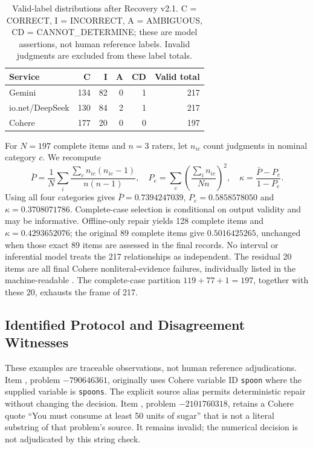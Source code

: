 \begin{table}[htbp]\centering\small
\caption{Valid-label distributions after Recovery v2.1. C = CORRECT, I = INCORRECT, A = AMBIGUOUS, CD = CANNOT\_DETERMINE; these are model assertions, not human reference labels. Invalid judgments are excluded from these label totals.}\label{tab:relationship-labels}
\begin{tabular}{@{}lrrrrr@{}}\toprule
Service & C & I & A & CD & Valid total\\\midrule
Gemini & 134 & 82 & 0 & 1 & 217\\
io.net/DeepSeek & 130 & 84 & 2 & 1 & 217\\
Cohere & 177 & 20 & 0 & 0 & 197\\\bottomrule
\end{tabular}\end{table}

For $N=197$ complete items and $n=3$ raters, let $n_{ic}$ count judgments in nominal category $c$. We recompute
\begin{equation}
\bar P=\frac{1}{N}\sum_i\frac{\sum_c n_{ic}(n_{ic}-1)}{n(n-1)},\quad
P_e=\sum_c\left(\frac{\sum_i n_{ic}}{Nn}\right)^2,\quad
\kappa=\frac{\bar P-P_e}{1-P_e}.
\end{equation}
Using all four categories gives $\bar P=0.7394247039$, $P_e=0.5858578050$ and $\kappa=0.3708071786$. Complete-case selection is conditional on output validity and may be informative. Offline-only repair yields 128 complete items and $\kappa=0.4293652076$; the original 89 complete items give $0.5016425265$, unchanged when those exact 89 items are assessed in the final records. No interval or inferential model treats the 217 relationships as independent. The residual 20 items are all final Cohere nonliteral-evidence failures, individually listed in the machine-readable . The complete-case partition $119+77+1=197$, together with these 20, exhausts the frame of 217.

\subsection{Identified Protocol and Disagreement Witnesses}
These examples are traceable observations, not human reference adjudications. Item , problem $-790646361$, originally uses Cohere variable ID \texttt{spoon} where the supplied variable is \texttt{spoons}. The explicit source alias permits deterministic repair without changing the decision. Item , problem $-2101760318$, retains a Cohere quote ``You must consume at least 50 units of sugar'' that is not a literal substring of that problem's source. It remains invalid; the numerical decision is not adjudicated by this string check.

